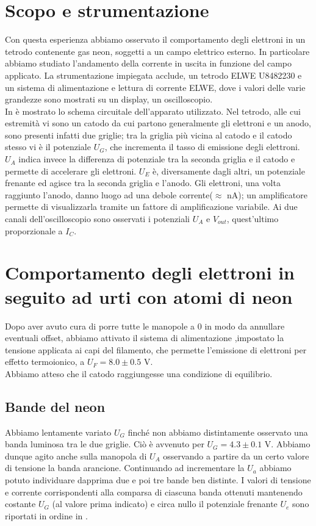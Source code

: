 \section{Scopo e strumentazione}

Con questa esperienza abbiamo osservato il comportamento degli elettroni in un tetrodo contenente gas neon, soggetti a un campo elettrico esterno. In particolare abbiamo studiato l'andamento della corrente in uscita in funzione del campo applicato. La strumentazione impiegata acclude, un tetrodo ELWE U8482230 e un sistema di alimentazione e lettura di corrente ELWE, dove i valori delle varie grandezze sono mostrati su un display, un oscilloscopio.\\
In  è mostrato lo schema circuitale dell'apparato utilizzato. Nel tetrodo, alle cui estremità vi sono un catodo da cui partono generalmente gli elettroni e un anodo, sono presenti infatti due griglie; tra la griglia più vicina al catodo e il catodo stesso vi è il potenziale 
$U_G$, che incrementa il tasso di emissione degli elettroni. $U_A$ indica invece la differenza di potenziale tra la seconda griglia e il catodo e permette di accelerare gli elettroni. $U_E$ è, diversamente dagli altri, un potenziale frenante ed agisce tra la seconda griglia e l'anodo. Gli elettroni, una volta raggiunto l'anodo, danno luogo ad una debole corrente($\approx$ nA); un amplificatore permette di visualizzarla tramite un fattore di amplificazione variabile. Ai due canali dell'oscilloscopio sono osservati i potenziali $U_A$ e $V_{out}$, quest'ultimo proporzionale a $I_C$.

\section{Comportamento degli elettroni in seguito ad urti con atomi di neon}

Dopo aver avuto cura di porre tutte le manopole a 0 in modo da annullare eventuali offset, abbiamo attivato il sistema di alimentazione ,impostato la tensione applicata ai capi del filamento, che permette l'emissione di elettroni per effetto termoionico, a $U_F = 8.0 \pm 0.5$ V.\\  Abbiamo atteso che il catodo raggiungesse una condizione di equilibrio.

\subsection{Bande del neon}

Abbiamo lentamente variato $U_G$ finché non abbiamo distintamente osservato una banda luminosa tra le due griglie. Ciò è avvenuto per $U_G = 4.3 \pm 0.1$ V. Abbiamo dunque agito anche sulla manopola di $U_A$ osservando a partire da un certo valore di tensione la banda arancione. Continuando ad incrementare la $U_a$ abbiamo potuto individuare dapprima due e poi tre bande ben distinte.  I valori di tensione e corrente corrispondenti alla comparsa di ciascuna banda ottenuti mantenendo costante $U_G$ (al valore prima indicato) e circa nullo il potenziale frenante $U_e$ sono riportati in ordine in .\\

